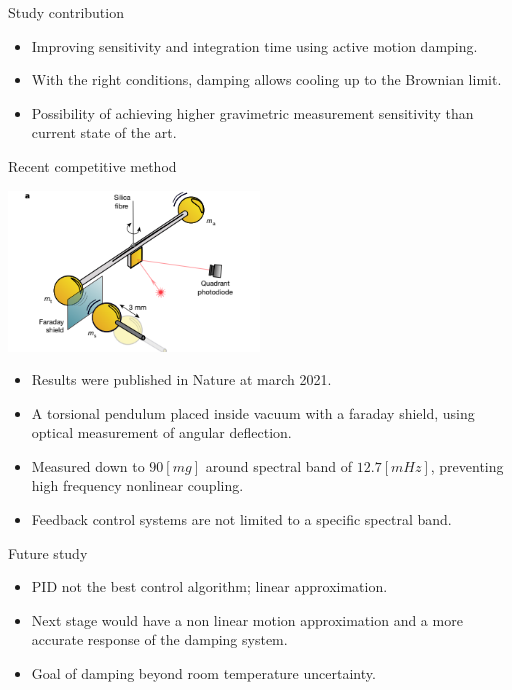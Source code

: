 \documentclass{beamer}
\begin{document}
\begin{frame}{Study contribution}
	\begin{itemize}
		\item Improving sensitivity and integration time using active motion damping.
		\item With the right conditions, damping allows cooling up to the Brownian limit. 
		\item Possibility of achieving higher gravimetric measurement sensitivity than current state of the art.
		
	\end{itemize}
\end{frame}




\begin{frame}{Recent competitive method}
\begin{center}		
		\includegraphics[width=0.5\textwidth,keepaspectratio]{nature.PNG}
	\end{center}

	\begin{itemize}
		\item Results were published in Nature at march 2021.

		\item A torsional pendulum placed inside vacuum with a faraday shield, using optical measurement of angular deflection.
		\item Measured down to $90 [mg]$ around spectral band of $12.7 [mHz]$, preventing high frequency nonlinear coupling.
		\item Feedback control systems are not limited to a specific spectral band.

	\end{itemize}
\end{frame}

\begin{frame}{Future study}
	\begin{itemize}
		
		\item PID not the best control algorithm; linear approximation. 
		\item Next stage would have a non linear motion approximation and a more accurate response of the damping system.
		\item Goal of damping beyond room temperature uncertainty. 
	\end{itemize}
\end{frame}
\end{document}
